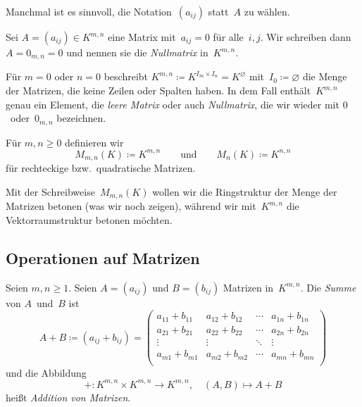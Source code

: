 \documentclass[a4paper]{article}
\begin{document}
Manchmal ist es sinnvoll, die Notation~$(a_{ij})$ statt~$A$ zu wählen.

\begin{definition}[Nullmatrix]
    Sei $A = (a_{ij}) \in K^{m,n}$ eine Matrix mit~$a_{ij} = 0$ für alle~$i,j$. Wir schreiben dann $A = 0_{m,n} = 0$ und nennen sie die \emph{Nullmatrix} in~$K^{m,n}$.

    Für $m = 0$ oder $n = 0$ beschreibt $K^{m,n} \coloneqq K^{I_m\times I_n} = K^\varnothing$ mit~$I_0 \coloneqq \varnothing$ die Menge der Matrizen, die keine Zeilen oder Spalten haben. In dem Fall enthält~$K^{m,n}$ genau ein Element, die \emph{leere Matrix} oder auch \emph{Nullmatrix}, die wir wieder mit $0$~oder~$0_{m,n}$ bezeichnen.
\end{definition}

\begin{notation}
    Für $m,n \geq 0$ definieren wir
    \begin{equation*}
        M_{m,n}(K) \coloneqq K^{m,n} \qquad\text{und}\qquad M_n(K) \coloneqq K^{n,n}
    \end{equation*}
    für rechteckige bzw.\ quadratische Matrizen.
\end{notation}

Mit der Schreibweise~$M_{m,n}(K)$ wollen wir die Ringstruktur der Menge der Matrizen betonen (was wir noch zeigen), während wir mit~$K^{m,n}$ die Vektorraumstruktur betonen möchten.


\subsection{Operationen auf Matrizen}

\begin{definition}[Addition]
    Seien $m,n \geq 1$. Seien $A = (a_{ij})$ und $B = (b_{ij})$ Matrizen in~$K^{m,n}$. Die \emph{Summe} von $A$~und~$B$ ist
    \begin{equation*}
        A+B \coloneqq (a_{ij}+b_{ij}) =
        \begin{pmatrix}
            a_{11}+b_{11} & a_{12}+b_{12} & \cdots & a_{1n}+b_{1n} \\
            a_{21}+b_{21} & a_{22}+b_{22} & \cdots & a_{2n}+b_{2n} \\
            \vdots        & \vdots        & \ddots & \vdots        \\
            a_{m1}+b_{m1} & a_{m2}+b_{m2} & \cdots & a_{mn}+b_{mn} \\
        \end{pmatrix}
    \end{equation*}
    und die Abbildung
    \begin{equation*}
        +\colon K^{m,n} \times K^{m,n} \to K^{m,n},\quad (A,B) \mapsto A+B
    \end{equation*}
    heißt \emph{Addition von Matrizen}.
\end{definition}
\end{document}
